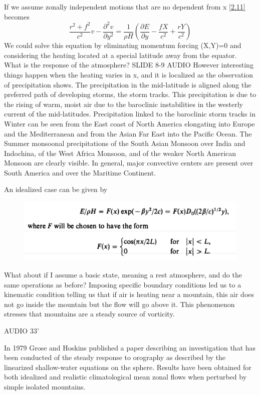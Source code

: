 If we assume zonally independent motions that are no dependent from x \ref{2.11} becomes
\begin{equation}
	\frac{r^2 + f^2}{c^2} v - \frac{\partial^2 v}{\partial y^2} = \frac{1}{\rho H} \left( \frac{\partial E}{\partial y} - \frac{fX}{c^2} + \frac{rY}{c^2} \right)
\end{equation}
We could solve this equation by eliminating momentum forcing (X,Y)=0 and considering the heating located at a special latitude away from the equator.\\[0.5 cm]

What is the response of the atmosphere?
SLIDE 8-9 AUDIO
However interesting things happen when the heating varies in x, and it is localized as the observation of precipitation shows. The precipitation in the mid-latitude is aligned along the preferred path of developing storms, the storm tracks. This precipitation is due to the rising of warm, moist air due to the baroclinic instabilities in the westerly current of the mid-latitudes. Precipitation linked to the baroclinic storm tracks in Winter can be seen from the East coast of North America elongating into Europe and the Mediterranean and from the Asian Far East into the Pacific Ocean. The Summer monsoonal precipitations of the South Asian Monsoon over India and Indochina, of the West Africa Monsoon, and of the weaker North American Monsoon are clearly visible. In general, major convective centers are present over South America and over the Maritime Continent.


An idealized case can be given by
\begin{figure}[h!]
	\centering
	\includegraphics[width=0.5\linewidth]{uploads/22image.png}
	\label{fig:enter-label}
\end{figure}

What about if I assume a basic state, meaning a rest atmosphere, and do the same operations as before? Imposing specific boundary conditions led us to a kinematic condition telling us that if air is heating near a mountain, this air does not go inside the mountain but the flow will go above it. This phenomenon stresses that mountains are a steady source of vorticity.

AUDIO 33'

In 1979 Grose and Hoskins published a paper describing an investigation that has been conducted of the steady response to orography as described by the linearized shallow-water equations on the sphere.
Results have been obtained for both idealized and realistic climatological mean zonal flows when perturbed by simple isolated mountains.

